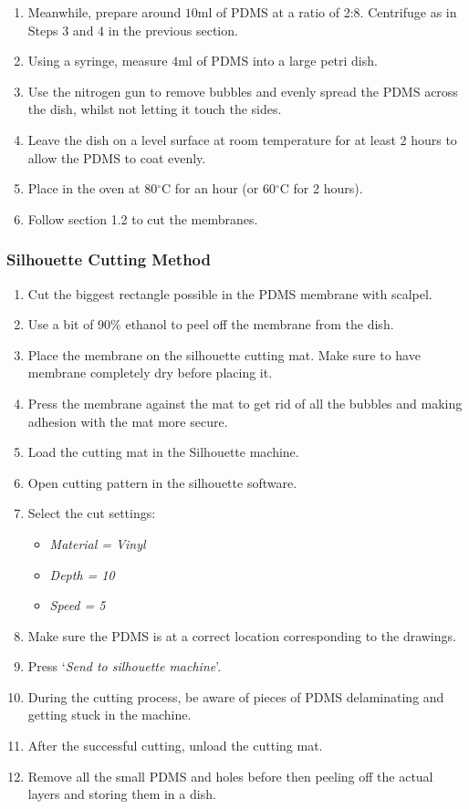 \begin{enumerate}
	 \setlength\itemsep{-0.1em}
	\item Meanwhile, prepare around $10  \text{ml}$ of PDMS at a ratio of 2:8. Centrifuge as in Steps 3 and 4 in the previous section.
	\item Using a syringe, measure $4  \text{ml}$ of PDMS into a large petri dish.
	\item Use the nitrogen gun to remove bubbles and evenly spread the PDMS across the dish, whilst not letting it touch the sides.
	\item Leave the dish on a level surface at room temperature for at least 2 hours to allow the PDMS to coat evenly.
	\item Place in the oven at 80$^{\circ}$C for an hour (or 60$^{\circ}$C for 2 hours).
	\item Follow section 1.2 to cut the membranes.
\end{enumerate}

\subsubsection*{Silhouette Cutting Method}

\begin{enumerate}
		 \setlength\itemsep{-0.1em}
	\setcounter{enumi}{6}
	\item Cut the biggest rectangle possible in the PDMS membrane with scalpel.
	\item Use a bit of $90\%$ ethanol to peel off the membrane from the dish.
	\item Place the membrane on the silhouette cutting mat. Make sure to have membrane completely dry before placing it.
	\item Press the membrane against the mat to get rid of all the bubbles and making adhesion with the mat more secure.
	\item Load the cutting mat in the Silhouette machine.
	\item Open cutting pattern in the silhouette software.
	\item Select the cut settings:
	\begin{itemize}
			 \setlength\itemsep{-0.1em}
		\item \textit{Material = Vinyl}
		\item \textit{Depth = 10}
		\item \textit{Speed = 5}
	\end{itemize}
	\item Make sure the PDMS is at a correct location corresponding to the drawings.
	\item Press `\textit{Send to silhouette machine}'.
	\item During the cutting process, be aware of pieces of PDMS delaminating and getting stuck in the machine.
	\item After the successful cutting, unload the cutting mat.
	\item Remove all the small PDMS and holes before then peeling off the actual layers and storing them in a dish.
\end{enumerate}

